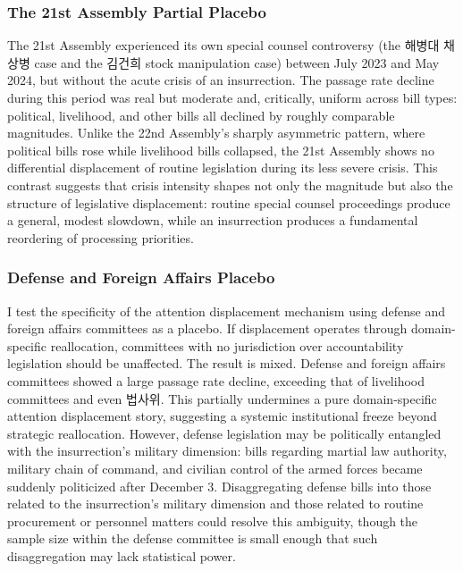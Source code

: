 \documentclass[11pt]{article}
\begin{document}
\subsubsection*{The 21st Assembly Partial Placebo}

The 21st Assembly experienced its own special counsel controversy (the 해병대 채상병 case and the 김건희 stock manipulation case) between July 2023 and May 2024, but without the acute crisis of an insurrection. The passage rate decline during this period was real but moderate and, critically, uniform across bill types: political, livelihood, and other bills all declined by roughly comparable magnitudes. Unlike the 22nd Assembly's sharply asymmetric pattern, where political bills rose while livelihood bills collapsed, the 21st Assembly shows no differential displacement of routine legislation during its less severe crisis. This contrast suggests that crisis intensity shapes not only the magnitude but also the structure of legislative displacement: routine special counsel proceedings produce a general, modest slowdown, while an insurrection produces a fundamental reordering of processing priorities.

\subsubsection*{Defense and Foreign Affairs Placebo}

I test the specificity of the attention displacement mechanism using defense and foreign affairs committees as a placebo. If displacement operates through domain-specific reallocation, committees with no jurisdiction over accountability legislation should be unaffected. The result is mixed. Defense and foreign affairs committees showed a large passage rate decline, exceeding that of livelihood committees and even 법사위. This partially undermines a pure domain-specific attention displacement story, suggesting a systemic institutional freeze beyond strategic reallocation. However, defense legislation may be politically entangled with the insurrection's military dimension: bills regarding martial law authority, military chain of command, and civilian control of the armed forces became suddenly politicized after December 3. Disaggregating defense bills into those related to the insurrection's military dimension and those related to routine procurement or personnel matters could resolve this ambiguity, though the sample size within the defense committee is small enough that such disaggregation may lack statistical power.
\end{document}
